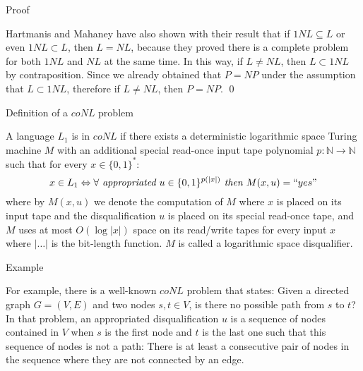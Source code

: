 \documentclass[11pt]{beamer}
\begin{document}
\begin{frame}{Proof}

Hartmanis and Mahaney have also shown with their result that if $1NL \subseteq L$ or even $1NL \subset L$, then $L=NL$, because they proved there is a complete problem for both $1NL$ and $NL$ at the same time. In this way, if $L \neq NL$, then $L \subset 1NL$ by contraposition. Since we already obtained that $P = NP$ under the assumption that $L \subset 1NL$, therefore if $L \neq NL$, then $P = NP$. \qed

\end{frame}

\begin{frame}{Definition of a $coNL$ problem}

\begin{definition}
A language $L_{1}$ is in $coNL$ if there exists a deterministic logarithmic space Turing machine $M$ with an additional special read-once input tape polynomial $p: \mathbb{N} \rightarrow \mathbb{N}$ such that for every $x \in \{0, 1\}^{*}$:
\[x \in L_{1} \Leftrightarrow \forall \textit{ appropriated } u \in \{0, 1\}^{p(|x|)} \textit{ then } M(x, u) = ``yes" \]
where by $M(x, u)$ we denote the computation of $M$ where $x$ is placed on its input tape and the disqualification $u$ is placed on its special read-once tape, and $M$ uses at most $O(\log |x|)$ space on its read/write tapes for every input $x$ where $|\ldots|$ is the bit-length function. $M$ is called a logarithmic space disqualifier.
\end{definition}

\end{frame}

\begin{frame}{Example}

For example, there is a well-known $coNL$ problem that states: Given a directed graph $G = (V, E)$ and two nodes $s, t \in V$, is there no possible path from $s$ to $t$? In that problem, an appropriated disqualification $u$ is a sequence of nodes contained in $V$ when $s$ is the first node and $t$ is the last one such that this sequence of nodes is not a path: There is at least a consecutive pair of nodes in the sequence where they are not connected by an edge.

\end{frame}
\end{document}

